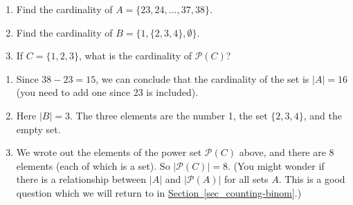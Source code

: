 \documentclass[11pt,]{book}
\theoremstyle{ptxplainnotitle}
\theoremstyle{ptxplaintitle}
\theoremstyle{ptxdefinitionnotitle}
\theoremstyle{ptxdefinitiontitle}
\theoremstyle{ptxdefinitionnotitle}
\theoremstyle{ptxdefinitiontitle}
\theoremstyle{ptxdefinitionnotitle}
\theoremstyle{ptxdefinitiontitle}
\theoremstyle{ptxdefinitiontitlenonumber}
\theoremstyle{ptxdefinitiontitlenonumber}
\numberwithin{equation}{chapter}
\newcommand{\pow}{\mathcal P}
\newcommand{\card}[1]{\left| #1 \right|}
\begin{document}
\begin{example}\label{example-31}
\hypertarget{p-740}{}%
\leavevmode%
\begin{enumerate}
\item\hypertarget{li-309}{}\hypertarget{p-741}{}%
Find the cardinality of \(A = \{23, 24, \ldots, 37, 38\}\).%
\item\hypertarget{li-310}{}\hypertarget{p-742}{}%
Find the cardinality of \(B = \{1, \{2, 3, 4\}, \emptyset\}\).%
\item\hypertarget{li-311}{}\hypertarget{p-743}{}%
If \(C = \{1,2,3\}\), what is the cardinality of \(\pow(C)\)?%
\end{enumerate}
%
\par\smallskip%
\noindent\textbf{}\hypertarget{solution-106}{}\hypertarget{p-744}{}%
\leavevmode%
\begin{enumerate}
\item\hypertarget{li-312}{}\hypertarget{p-745}{}%
Since \(38 - 23 = 15\), we can conclude that the cardinality of the set is \(|A| = 16\) (you need to add one since 23 is included).%
\item\hypertarget{li-313}{}\hypertarget{p-746}{}%
Here \(|B| = 3\). The three elements are the number 1, the set \(\{2,3,4\}\), and the empty set.%
\item\hypertarget{li-314}{}\hypertarget{p-747}{}%
We wrote out the elements of the power set \(\pow(C)\) above, and there are 8 elements (each of which is a set). So \(\card{\pow(C)} = 8\).  (You might wonder if there is a relationship between \(\card{A}\) and \(\card{\pow(A)}\) for all sets \(A\).  This is a good question which we will return to in \hyperref[sec_counting-binom]{Section~\ref{sec_counting-binom}}.)%
\end{enumerate}
%
\end{example}
\typeout{************************************************}
\typeout{************************************************}
\end{document}
